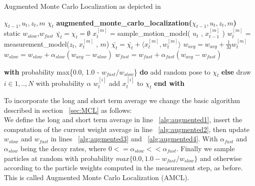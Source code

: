 \documentclass[	DIV=calc,%
							paper=a4,%
							fontsize=9pt,%
							twocolumn]{scrartcl}	 					%
\newcommand{\tab}{\hspace*{2em}} %
\begin{document}
\begin{algorithm}[h!]
\caption{Augmented Monte Carlo Localization as depicted in \cite{ProbabilisticRobotics}}
\begin{algorithmic}[1]
$\chi_{t-1}, u_t, z_t,m$
$\chi_t$
\STATE \textbf{augmented\_monte\_carlo\_localization(}$\chi_{t-1}, u_t, z_t,m$\textbf{)}
\STATE static $w_{slow}$,$ w_{fast}$ \label{alg:augmented1}\;
\STATE $\bar{\chi_t} = \chi_t = \emptyset$\;
\STATE $x^{[m]}_t$ = sample\_motion\_model( $u_t$ , $x^{[m]}_{t-1}$ )\;
\STATE $w^{[m]}_t$ = measurement\_model($z_t$, $x^{[m]}_t$ , $m$)\;
\STATE $\bar{\chi_t} = \bar{\chi_t} + \langle x^{[m]}_t, w^{[m]}_t \rangle $\;
\STATE $w_{avg} = w_{avg} + \frac{1}{M} w^{[m]}_t $ \label{alg:augmented2}
\ENDFOR
\STATE $w_{slow} = w_{slow} + \alpha_{slow}(w_{avg} - w_{slow})$ \label{alg:augmented3}\;
\STATE $w_{fast} = w_{fast} + \alpha_{fast}(w_{avg} - w_{fast})$ \label{alg:augmented4}\;

\STATE \textbf{with} probability max\{0.0, 1.0 - $w_{fast}/w_{slow}$\} \textbf{do}
\STATE \tab add random pose to $\chi_t$
\STATE \textbf{else}
\STATE \tab draw $i\in{1,..,N}$ with probability $\alpha$  $w^{[i]}_t$\;
\STATE \tab add $x^{[i]}_t $ to $\chi_t$\;
\STATE \textbf{end with}
\ENDFOR
\end{algorithmic}
\end{algorithm}


To incorporate the long and short term average we change the basic algorithm described in section ~\ref{sec:MCL} as follows:\\
We define the long and short term average in line ~\ref{alg:augmented1}, insert the computation of the current weight average in line ~\ref{alg:augmented2}, then update $w_{slow}$ and $w_{fast}$ in lines ~\ref{alg:augmented3} and ~\ref{alg:augmented4}. With $\alpha_{fast}$ and $\alpha_{slow}$ being the decay rates, where $0<=\alpha_{slow}<<\alpha_{fast}$. Finally we sample particles at random with probability $max\{0.0,1.0-w_{fast}/w_{slow}\}$ and otherwise according to the particle weights computed in the measurement step, as before.
This is called Augmented Monte Carlo Localization (AMCL).
\end{document}
